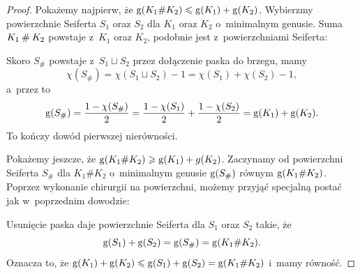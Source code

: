 \begin{proof}
    Pokażemy najpierw, że $\operatorname{g} (K_1 \# K_2) \leqslant \operatorname{g} (K_1) + \operatorname{g} (K_2)$.
    Wybierzmy powierzchnie Seiferta $S_1$ oraz $S_2$ dla $K_1$ oraz $K_2$ o~minimalnym genusie.
    Suma $K_1 \mathbin{\#} K_2$ powstaje z~$K_1$ oraz $K_2$, podobnie jest z~powierzchniami Seiferta:

    Skoro $S_{\#}$ powstaje z~$S_1 \sqcup S_2$ przez dołączenie paska do brzegu, mamy
    \begin{equation}
        \chi(S_{\#}) = \chi(S_1 \sqcup S_2) - 1 = \chi(S_1) + \chi(S_2)-1,
    \end{equation}
    a~przez to
    \begin{equation}
        \operatorname{g} (S_{\#}) = \frac{1-\chi(S_{\#})}{2} =
        \frac{1-\chi(S_1)}{2} + \frac{1-\chi(S_2)}{2}
        = \operatorname{g}(K_1) + \operatorname{g}(K_2).
    \end{equation}
    To kończy dowód pierwszej nierówności.

    Pokażemy jeszcze, że $\operatorname{g} (K_1 \# K_2) \geqslant \operatorname{g} (K_1) + g(K_2)$.
    Zaczynamy od powierzchni Seiferta $S_{\#}$ dla $K_1 \# K_2$ o~minimalnym genusie $\operatorname{g} (S_{\#})$ równym $\operatorname{g} (K_1 \# K_2)$.
    Poprzez wykonanie chirurgii na powierzchni, możemy przyjąć specjalną postać jak w~poprzednim dowodzie:

    Usunięcie paska daje powierzchnie Seiferta dla $S_1$ oraz $S_2$ takie, że
    \begin{equation}
        \operatorname{g}(S_1) + \operatorname{g}(S_2) = \operatorname{g}(S_{\#}) = \operatorname{g}(K_1 \# K_2).
    \end{equation}
    Oznacza to, że $\operatorname{g}(K_1) + \operatorname{g}(K_2) \leqslant \operatorname{g}(S_1) + \operatorname{g}(S_2) = \operatorname{g}(K_1 \# K_2)$ i~mamy równość.
\end{proof}

